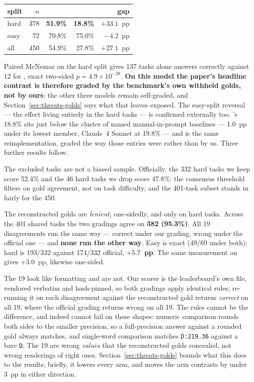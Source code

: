 \begin{center}
\small
\begin{tabular}{@{}lrrrr@{}}
\toprule
split & $n$ & \armC{} & \armM{} & gap \\
\midrule
hard & 378 & \textbf{51.9\%} & \textbf{18.8\%} & $+33.1$~pp \\
easy & 72  & 70.8\% & 75.0\% & $-4.2$~pp \\
all  & 450 & 54.9\% & 27.8\% & $+27.1$~pp \\
\bottomrule
\end{tabular}
\end{center}

\noindent Paired McNemar on the hard split gives 137 tasks \armC{} alone
answers correctly against 12 for \armM{}, exact two-sided $p = 4.9\times
10^{-28}$. \textbf{On this model the paper's headline contrast is therefore graded by
the benchmark's own withheld golds, not by ours}; the other three models
remain self-graded, and Section~\ref{sec:threats-golds} says what that
leaves exposed. The easy-split reversal --- the effect living entirely in the
hard tasks --- is confirmed externally too.
\armM{}'s 18.8\% sits just below the cluster of named manual-in-prompt
baselines --- 1.0~pp under its lowest member, Claude~4 Sonnet at 19.8\% ---
and is the same reimplementation, graded the way those entries were rather
than by us. Three further results follow.

The excluded tasks are not a biased sample. Officially, the 332 hard tasks we
keep score 52.4\% and the 46 hard tasks we drop score 47.8\%: the
consensus threshold filters on gold agreement, not on task difficulty, and the
401-task subset stands in fairly for the 450.

The reconstructed golds are \emph{lenient}, one-sidedly, and only on hard
tasks. Across the 401 shared tasks the two gradings agree on \textbf{382
(95.3\%)}. All 19 disagreements run the same way --- correct under our
grading, wrong under the official one --- and \textbf{none run the other
way}. Easy is exact (49/69 under both); hard is 193/332 against 174/332
official, \textbf{$+5.7$~pp}. The same measurement on \armM{} gives
$+3.0$~pp, likewise one-sided.

The 19 look like formatting and are not. Our scorer is the leaderboard's own
file, vendored verbatim and hash-pinned, so both gradings apply identical
rules; re-running it on each disagreement against the reconstructed gold
returns \emph{correct} on all 19, where the official grading returns wrong on
all 19. The rules cannot be the difference, and indeed cannot fail on these
shapes: numeric comparison rounds both sides to the smaller precision, so a
full-precision answer against a rounded gold always matches, and single-word
comparison matches \texttt{D:219.36} against a bare \texttt{D}. The 19 are
wrong \emph{values} that the reconstructed golds concealed, not wrong
renderings of right ones. Section~\ref{sec:threats-golds} bounds what this
does to the results; briefly, it lowers every arm, and moves the arm contrasts
by under 3~pp in either direction.

